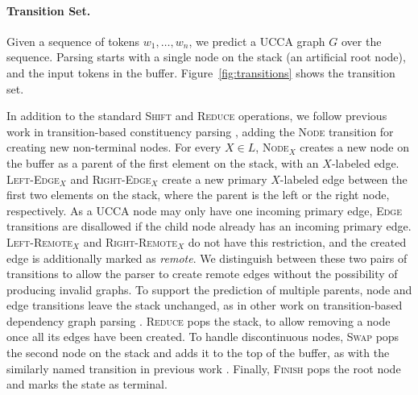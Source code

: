 \documentclass[11pt,a4paper]{article}
\newcommand{\figref}[1]{Figure~\ref{#1}}
\begin{document}
\paragraph{Transition Set.}
Given a sequence of tokens $w_1, \ldots, w_n$, we predict a UCCA graph $G$ over the sequence.
Parsing starts with a single node on the stack (an artificial root node), and the input tokens
in the buffer. \figref{fig:transitions} shows the transition set.

In addition to the standard \textsc{Shift} and \textsc{Reduce} operations, 
we follow previous work in transition-based constituency parsing \cite{sagae2005classifier},
adding the \textsc{Node} transition for creating new non-terminal nodes.
For every $X\in L$,
\textsc{Node$_X$} creates a new node on the buffer as a parent of the first element on the stack, with an $X$-labeled edge.
\textsc{Left-Edge$_X$} and \textsc{Right-Edge$_X$} create a new primary $X$-labeled edge between the first two elements on the stack, where the parent is the left or the right node, respectively.
As a UCCA node may only have one incoming primary edge,
\textsc{Edge} transitions are disallowed if the child node already
has an incoming primary edge.
\textsc{Left-Remote$_X$} and \textsc{Right-Remote$_X$} do not have this restriction,
and the created edge is additionally marked as \textit{remote}.
We distinguish between these two pairs of transitions to allow the parser to create remote edges
without the possibility of producing invalid graphs.
To support the prediction of multiple parents, node and edge transitions
leave the stack unchanged, as in other work on
transition-based dependency graph parsing
\cite{sagae2008shift,ribeyre-villemontedelaclergerie-seddah:2014:SemEval,tokgoz2015transition}.
\textsc{Reduce} pops the stack, to allow removing a node
once all its edges have been created.
To handle discontinuous nodes, \textsc{Swap} pops the second
node on the stack and adds it to the top of the buffer, as with the similarly
named transition in previous work \cite{nivre2009non,maier2015discontinuous}.
Finally, \textsc{Finish} pops the root node and marks the state as terminal.
\end{document}
